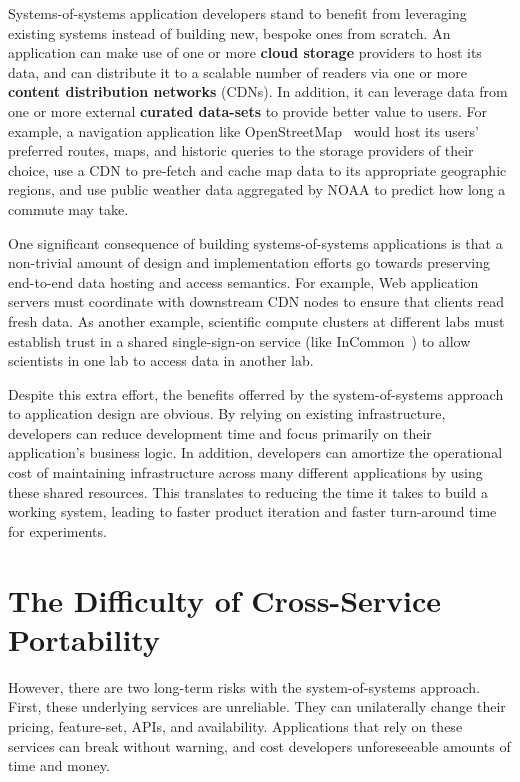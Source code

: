 Systems-of-systems application developers stand to benefit
from leveraging existing systems instead of building new, bespoke ones from
scratch.  An application can make use of one or more \textbf{cloud storage}
providers to host its data, and can distribute it to a scalable number of readers via one or more \textbf{content
distribution networks} (CDNs).  In addition, it can leverage data from
one or more external \textbf{curated data-sets} to provide better value to users.
For example, a navigation application like OpenStreetMap~\cite{openstreetmap} would host its users'
preferred routes, maps, and historic queries to the storage providers of their choice,
use a CDN to pre-fetch and cache map data to its appropriate geographic regions,
and use public weather data aggregated by NOAA to predict how long a commute may take.

One significant consequence of building systems-of-systems applications
is that a non-trivial amount of design and implementation efforts go towards
preserving end-to-end data hosting and access semantics.  For example, Web
application servers must coordinate with downstream CDN nodes to ensure that
clients read fresh data.  As another example, scientific compute clusters at
different labs must establish trust in a shared single-sign-on service (like
InCommon~\cite{incommon}) to allow scientists in one lab to access data in
another lab.

Despite this extra effort, the benefits offerred by the system-of-systems
approach to application design are obvious.  By relying on existing infrastructure,
developers can reduce development time and focus primarily on their application's business
logic.  In addition, developers can amortize the operational cost of
maintaining infrastructure across many different applications by using these
shared resources.  This translates to reducing the time it takes to build a
working system, leading to faster product iteration and faster turn-around time
for experiments.

\section{The Difficulty of Cross-Service Portability}

However, there are two long-term risks with the system-of-systems approach.
First, these underlying services are unreliable.  They can unilaterally
change their pricing, feature-set, APIs, and availability.
Applications that rely on these services can break without warning,
and cost developers unforeseeable amounts of time and money.

